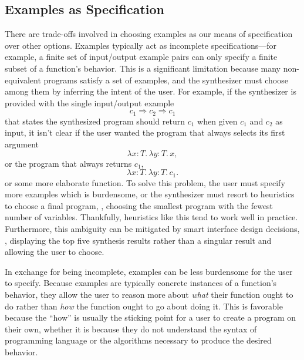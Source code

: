 \subsection{Examples as Specification}
\label{subsec:examples-as-specification}

There are trade-offs involved in choosing examples as our means of specification over other options.
Examples typically act as incomplete specifications---for example, a finite set of input/output example pairs can only specify a finite subset of a function's behavior.
This is a significant limitation because many non-equivalent programs satisfy a set of examples, and the synthesizer must choose among them by inferring the intent of the user.
For example, if the synthesizer is provided with the single input/output example
\[
  c_1 ⇒ c_2 ⇒ c_1
\]
that states the synthesized program should return $c_1$ when given $c_1$ and $c_2$ as input, it isn't clear if the user wanted the program that always selects its first argument
\[
  λx{:}T.\,λy{:}T.\,x,
\]
or the program that always returns $c_1$,
\[
  λx{:}T.\,λy{:}T.\,c_1.
\]
or some more elaborate function.
To solve this problem, the user must specify more examples which is burdensome, or the synthesizer must resort to heuristics to choose a final program, \eg, choosing the smallest program with the fewest number of variables.
Thankfully, heuristics like this tend to work well in practice.
Furthermore, this ambiguity can be mitigated by smart interface design decisions, \eg, displaying the top five synthesis results rather than a singular result and allowing the user to choose.

In exchange for being incomplete, examples can be less burdensome for the user to specify.
Because examples are typically concrete instances of a function's behavior, they allow the user to reason more about \emph{what} their function ought to do rather than \emph{how} the function ought to go about doing it.
This is favorable because the ``how'' is usually the sticking point for a user to create a program on their own, whether it is because they do not understand the syntax of programming language or the algorithms necessary to produce the desired behavior.

